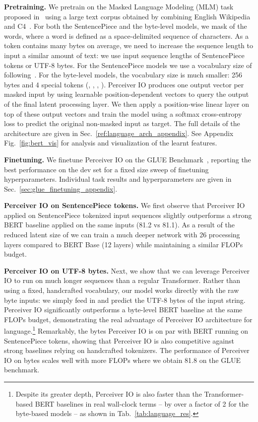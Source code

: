 \documentclass{article} \usepackage{iclr2022_conference,times}
\newcommand{\ourmodel}{Perceiver IO\xspace}
\begin{document}
\noindent
\textbf{Pretraining.}
We pretrain on the Masked Language Modeling (MLM) task proposed in~\cite{devlin2019bert} using a large text corpus obtained by combining English Wikipedia and C4~\citep{raffell2020exploring}. For both the SentencePiece and the byte-level models, we mask  of the words, where a word is defined as a space-delimited sequence of characters. 
As a token contains many bytes on average, we need to increase the sequence length to input a similar amount of text: we use input sequence lengths of  SentencePiece tokens or  UTF-8 bytes. 
For the SentencePiece models we use a vocabulary size of  following~\cite{devlin2019bert}. 
For the byte-level models, the vocabulary size is much smaller: 256 bytes and 4 special tokens (, , , ).
\ourmodel{} produces one output vector per masked input by using learnable position-dependent vectors to query the output of the final latent processing layer.
We then apply a position-wise linear layer on top of these output vectors and train the model using a softmax cross-entropy loss to predict the original non-masked input as target.
The full details of the architecture are given in Sec.~\ref{ref:language_arch_appendix}. See Appendix Fig.~\ref{fig:bert_vis} for analysis and visualization of the learnt features.


\noindent
\textbf{Finetuning.}
We finetune \ourmodel{} on the GLUE Benchmark~\cite{wang2018glue}, reporting the best performance on the dev set for a fixed size sweep of finetuning hyperparameters. Individual task results and hyperparameters are given in Sec.~\ref{sec:glue_finetuning_appendix}. 

\noindent
\textbf{\ourmodel{} on SentencePiece tokens.}
We first observe that \ourmodel{} applied on SentencePiece tokenized input sequences slightly outperforms a strong BERT baseline applied on the same inputs (81.2 vs 81.1).
As a result of the reduced latent size of  we can train a much deeper network with 26 processing layers compared to BERT Base (12 layers) while maintaining a similar FLOPs budget.

\noindent
\textbf{\ourmodel{} on UTF-8 bytes.}
Next, we show that we can leverage \ourmodel{} to run on much longer sequences than a regular Transformer. Rather than using a fixed, handcrafted vocabulary, our model works directly with the raw byte inputs: we simply feed in and predict the UTF-8 bytes of the input string.
\ourmodel{} significantly outperforms a byte-level BERT baseline at the same FLOPs budget, demonstrating the real advantage of \ourmodel{} architecture for language.\footnote{Despite its greater depth, \ourmodel is also faster than the Transformer-based BERT baselines in real wall-clock terms -- by over a factor of 2 for the byte-based models -- as shown in Tab.~\ref{tab:language_res}.}
Remarkably, the bytes \ourmodel{} is on par with BERT running on SentencePiece tokens, showing that \ourmodel{} is also competitive against strong baselines relying on handcrafted tokenizers. The performance of \ourmodel{} on bytes scales well with more FLOPs where we obtain 81.8 on the GLUE benchmark.
\end{document}
